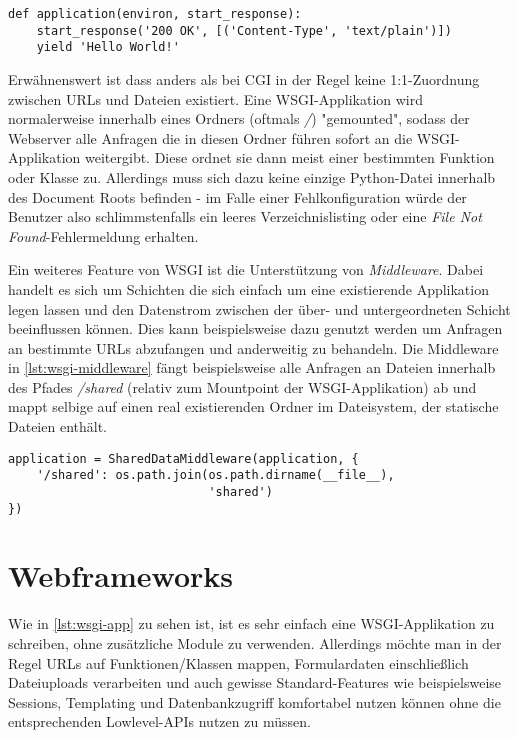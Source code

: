 \begin{lstlisting}[caption=Einfache WSGI-Applikation,label=lst:wsgi-app]
def application(environ, start_response):
    start_response('200 OK', [('Content-Type', 'text/plain')])
    yield 'Hello World!'
\end{lstlisting}

Erwähnenswert ist dass anders als bei CGI in der Regel keine 1:1-Zuordnung zwischen URLs und Dateien
existiert. Eine WSGI-Applikation wird normalerweise innerhalb eines Ordners (oftmals \emph{/})
"gemounted", sodass der Webserver alle Anfragen die in diesen Ordner führen sofort an die
WSGI-Applikation weitergibt. Diese ordnet sie dann meist einer bestimmten Funktion oder Klasse zu.
Allerdings muss sich dazu keine einzige Python-Datei innerhalb des Document Roots befinden - im
Falle einer Fehlkonfiguration würde der Benutzer also schlimmstenfalls ein leeres Verzeichnislisting
oder eine \emph{File Not Found}-Fehlermeldung erhalten.

Ein weiteres Feature von WSGI ist die Unterstützung von \emph{Middleware}. Dabei handelt es sich um
Schichten die sich einfach um eine existierende Applikation legen lassen und den Datenstrom
zwischen der über- und untergeordneten Schicht beeinflussen können. Dies kann beispielsweise dazu
genutzt werden um Anfragen an bestimmte URLs abzufangen und anderweitig zu behandeln. Die Middleware
in \autoref{lst:wsgi-middleware} fängt beispielsweise alle Anfragen an Dateien innerhalb des Pfades
\emph{/shared} (relativ zum Mountpoint der WSGI-Applikation) ab und mappt selbige auf einen real
existierenden Ordner im Dateisystem, der statische Dateien enthält.

\begin{lstlisting}[caption=WSGI-Middleware,label=lst:wsgi-middleware]
application = SharedDataMiddleware(application, {
    '/shared': os.path.join(os.path.dirname(__file__),
                            'shared')
})
\end{lstlisting}


\section{Webframeworks}

Wie in \autoref{lst:wsgi-app} zu sehen ist, ist es sehr einfach eine WSGI-Applikation zu schreiben,
ohne zusätzliche Module zu verwenden. Allerdings möchte man in der Regel URLs auf Funktionen/Klassen
mappen, Formulardaten einschließlich Dateiuploads verarbeiten und auch gewisse Standard-Features wie
beispielsweise Sessions, Templating und Datenbankzugriff komfortabel nutzen können ohne die
entsprechenden Lowlevel-APIs nutzen zu müssen.


